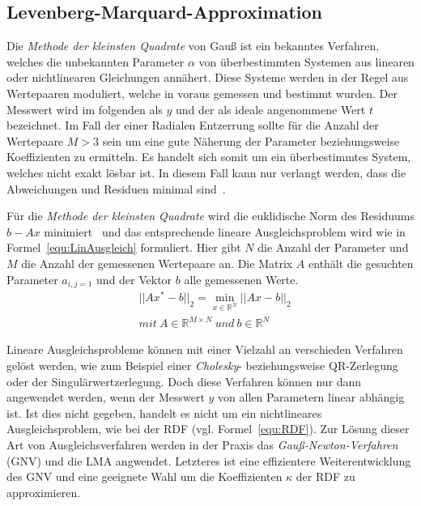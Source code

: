 \subsection{Levenberg-Marquard-Approximation}
Die \textit{Methode der kleinsten Quadrate} von Gauß ist ein bekanntes Verfahren, welches die unbekannten Parameter $\alpha$ von überbestimmten Systemen aus linearen oder nichtlinearen Gleichungen annähert. Diese Systeme werden in der Regel aus Wertepaaren moduliert, welche in voraus gemessen und bestimmt wurden. Der Messwert wird im folgenden als $y$ und der als ideale angenommene Wert $t$ bezeichnet.
Im Fall der einer Radialen Entzerrung sollte für die Anzahl der Wertepaare $M>3$ sein um eine gute Näherung der Parameter beziehungsweise Koeffizienten zu ermitteln.
Es handelt sich somit um ein überbestimmtes System, welches nicht exakt lösbar ist. In diesem Fall kann nur verlangt werden, dass die Abweichungen und Residuen minimal sind~\cite{schwarz2011numerische}. 

Für die \textit{Methode der kleinsten Quadrate} wird die euklidische Norm des Residuums $b-Ax$ minimiert~\cite{dahmen2008numerik} und das entsprechende lineare Ausgleichsproblem wird wie in Formel~\ref{equ:LinAusgleich} formuliert. Hier gibt $N$ die Anzahl der Parameter und $M$ die Anzahl der gemessenen Wertepaare an. Die Matrix $A$ enthält die gesuchten Parameter $a_{i,j=1}$ und der Vektor $b$ alle gemessenen Werte.
\begin{equation}
\label{equ:LinAusgleich}
\begin{aligned}
& ||Ax^*-b||_2 = \min_{x\in \mathbb{R}^N} ||Ax-b||_2\\
& mit\ A\in \mathbb{R}^{M\times N}\ und\ b\in \mathbb{R}^{N}
\end{aligned}
\end{equation}

Lineare Ausgleichsprobleme können mit einer Vielzahl an verschieden Verfahren gelöst werden, wie zum Beispiel einer \textit{Cholesky}- beziehungsweise QR-Zerlegung oder der Singulärwertzerlegung.
Doch diese Verfahren können nur dann angewendet werden, wenn der Messwert $y$ von allen Parametern linear abhängig ist. Ist dies nicht gegeben, handelt es nicht um ein nichtlineares Ausgleichsproblem, wie bei der RDF (vgl. Formel~\ref{equ:RDF}). Zur Lösung dieser Art von Ausgleichsverfahren werden in der Praxis das \textit{Gauß-Newton-Verfahren} (GNV) und die LMA angwendet. Letzteres ist eine effizientere Weiterentwicklung des GNV und eine geeignete Wahl um die Koeffizienten $\kappa$ der RDF zu approximieren.

